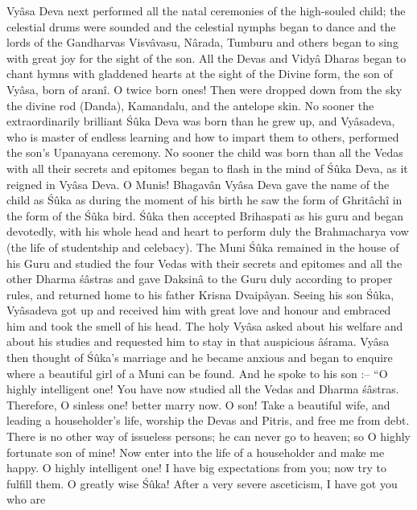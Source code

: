Vy\^asa Deva next performed all the natal ceremonies of the high-souled child; the celestial drums were sounded and the celestial nymphs began to dance and the lords of the Gandharvas Visv\^avasu, N\^arada, Tumburu and others began to sing with great joy for the sight of the son. All the Devas and Vidy\^a Dharas began to chant hymns with gladdened hearts at the sight of the Divine form, the son of Vy\^asa, born of aran\^i. O twice born ones! Then were dropped down from the sky the divine rod (Danda), Kamandalu, and the antelope skin. No sooner the extraordinarily brilliant \'S\^uka Deva was born than he grew up, and Vy\^asadeva, who is master of endless learning and how to impart them to others, performed the son's Upanayana ceremony. No sooner the child was born than all the Vedas with all their secrets and epitomes began to flash in the mind of \'S\^uka Deva, as it reigned in Vy\^asa Deva. O Munis! Bhagav\^an Vy\^asa Deva gave the name of the child as \'S\^uka as during the moment of his birth he saw the form of Ghrit\^ach\^i in the form of the \'S\^uka bird. \'S\^uka then accepted Brihaspati as his guru and began devotedly, with his whole head and heart to perform duly the Brahmacharya vow (the life of studentship and celebacy). The Muni \'S\^uka remained in the house of his Guru and studied the four Vedas with their secrets and epitomes and all the other Dharma \'s\^astras and gave Daksin\^a to the Guru duly according to proper rules, and returned home to his father Krisna Dvaip\^ayan. Seeing his son \'S\^uka, Vy\^asadeva got up and received him with great love and honour and embraced him and took the smell of his head. The holy Vy\^asa asked about his welfare and about his studies and requested him to stay in that auspicious \^a\'srama. Vy\^asa then thought of \'S\^uka's marriage and he became anxious and began to enquire where a beautiful girl of a Muni can be found. And he spoke to his son :-- ``O highly intelligent one! You have now studied all the Vedas and Dharma \'s\^astras. Therefore, O sinless one! better marry now. O son! Take a beautiful wife, and leading a householder's life, worship the Devas and Pitris, and free me from debt. There is no other way of issueless persons; he can never go to heaven; so O highly fortunate son of mine! Now enter into the life of a householder and make me happy. O highly intelligent one! I have big expectations from you; now try to fulfill them. O greatly wise \'S\^uka! After a very severe asceticism, I have got you who are

